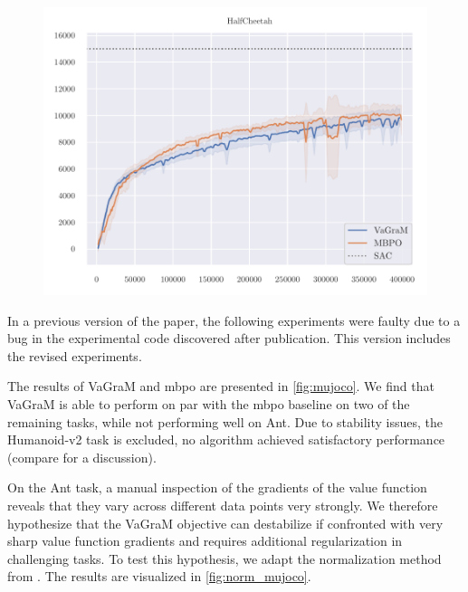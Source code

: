 \begin{figure}[t]
\begin{center}
\begin{minipage}{.49\textwidth}
    \centering
    \includegraphics[width=\textwidth]{figures/vagram/cheetah_nonorm.pdf}
\end{minipage}
\end{center}
    \caption{}
    \label{fig:mujoco}
\end{figure}


In a previous version of the paper, the following experiments were faulty due to a bug in the experimental code discovered after publication.
This version includes the revised experiments.

The results of VaGraM and \ac{mbpo} are presented in \autoref{fig:mujoco}.
We find that VaGraM is able to perform on par with the \ac{mbpo} baseline on two of the remaining tasks, while not performing well on Ant.
Due to stability issues, the Humanoid-v2 task is excluded, no algorithm achieved satisfactory performance (compare \textcite{pineda2021mbrl} for a discussion). 

On the Ant task, a manual inspection of the gradients of the value function reveals that they vary across different data points very strongly.
We therefore hypothesize that the VaGraM objective can destabilize if confronted with very sharp value function gradients and requires additional regularization in challenging tasks.
To test this hypothesis, we adapt the normalization method from \textcite{bjorck2022is}.
The results are visualized in \autoref{fig:norm_mujoco}.

